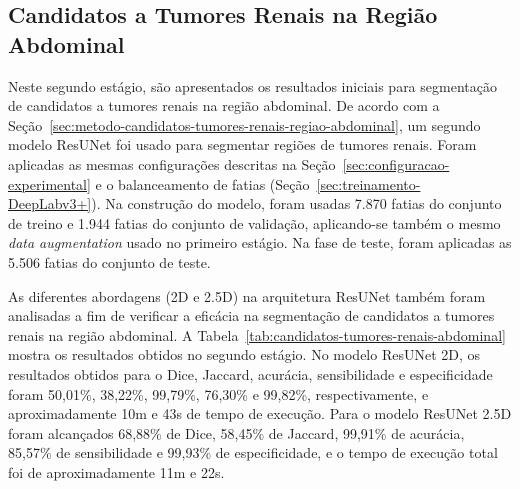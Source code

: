 
\subsection{Candidatos a Tumores Renais na Região Abdominal}
\label{sec:resultados-candidatores-tumores-renais-regiao-abdominal}

Neste segundo estágio, são apresentados os resultados iniciais para segmentação de candidatos a tumores renais na região abdominal. De acordo com a Seção~\ref{sec:metodo-candidatos-tumores-renais-regiao-abdominal}, um segundo modelo ResUNet foi usado para segmentar regiões de tumores renais. Foram aplicadas as mesmas configurações descritas na Seção~\ref{sec:configuracao-experimental} e o balanceamento de fatias (Seção~\ref{sec:treinamento-DeepLabv3+}). Na construção do modelo, foram usadas 7.870 fatias do conjunto de treino e 1.944 fatias do conjunto de validação, aplicando-se também o mesmo \textit{data augmentation} usado no primeiro estágio. Na fase de teste, foram aplicadas as 5.506 fatias do conjunto de teste.
 
As diferentes abordagens (2D e 2.5D) na arquitetura ResUNet também foram analisadas a fim de verificar a eficácia na segmentação de candidatos a tumores renais na região abdominal. A Tabela~\ref{tab:candidatos-tumores-renais-abdominal} mostra os resultados obtidos no segundo estágio. No modelo ResUNet 2D, os resultados obtidos para o Dice, Jaccard, acurácia, sensibilidade e especificidade foram 50,01\%, 38,22\%, 99,79\%, 76,30\% e 99,82\%, respectivamente, e aproximadamente 10m e 43s de tempo de execução. Para o modelo ResUNet 2.5D foram alcançados 68,88\% de Dice, 58,45\% de Jaccard, 99,91\% de acurácia, 85,57\% de sensibilidade e 99,93\% de especificidade, e o tempo de execução total foi de aproximadamente 11m e 22s.

